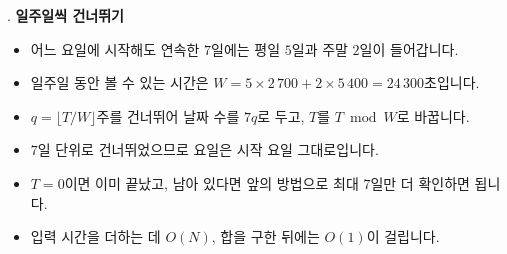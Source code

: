 \begin{frame}{\textbf{\pletter}. \ptitle}
    \textbf{일주일씩 건너뛰기}
\begin{itemize}
        \item 어느 요일에 시작해도 연속한 $7$일에는 평일 $5$일과 주말 $2$일이 들어갑니다.
        \item 일주일 동안 볼 수 있는 시간은 $W=5\times2\,700+2\times5\,400=24\,300$초입니다.
        \item $q=\lfloor T/W\rfloor$주를 건너뛰어 날짜 수를 $7q$로 두고, $T$를 $T\bmod W$로 바꿉니다.
        \item $7$일 단위로 건너뛰었으므로 요일은 시작 요일 그대로입니다.
        \item $T=0$이면 이미 끝났고, 남아 있다면 앞의 방법으로 최대 $7$일만 더 확인하면 됩니다.
        \item 입력 시간을 더하는 데 $O(N)$, 합을 구한 뒤에는 $O(1)$이 걸립니다.
    \end{itemize}
\end{frame}
